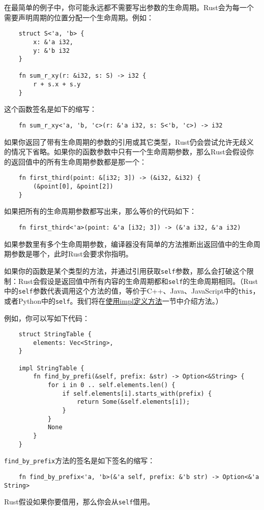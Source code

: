 在最简单的例子中，你可能永远都不需要写出参数的生命周期。Rust会为每一个需要声明周期的位置分配一个生命周期。例如：
\begin{verbatim}
    struct S<'a, 'b> {
        x: &'a i32,
        y: &'b i32
    }

    fn sum_r_xy(r: &i32, s: S) -> i32 {
        r + s.x + s.y
    }
\end{verbatim}

这个函数签名是如下的缩写：
\begin{verbatim}
    fn sum_r_xy<'a, 'b, 'c>(r: &'a i32, s: S<'b, 'c>) -> i32
\end{verbatim}

如果你返回了带有生命周期的参数的引用或其它类型，Rust仍会尝试允许无歧义的情况下省略。如果你的函数参数中只有一个生命周期参数，那么Rust会假设你的返回值中的所有生命周期参数都是那一个：
\begin{verbatim}
    fn first_third(point: &[i32; 3]) -> (&i32, &i32) {
        (&point[0], &point[2])
    }
\end{verbatim}

如果把所有的生命周期参数都写出来，那么等价的代码如下：
\begin{verbatim}
    fn first_third<'a>(point: &'a [i32; 3]) -> (&'a i32, &'a i32)
\end{verbatim}

如果参数里有多个生命周期参数，编译器没有简单的方法推断出返回值中的生命周期参数是哪个，此时Rust会要求你指明。

如果你的函数是某个类型的方法，并通过引用获取\texttt{self}参数，那么会打破这个限制：Rust会假设是返回值中所有内容的生命周期都和\texttt{self}的生命周期相同。（Rust中的\texttt{self}参数代表调用这个方法的值，等价于C++、Java、JavaScript中的\texttt{this}，或者Python中的\texttt{self}。我们将在\hyperref[method]{使用impl定义方法}一节中介绍方法。）

例如，你可以写如下代码：
\begin{verbatim}
    struct StringTable {
        elements: Vec<String>,
    }

    impl StringTable {
        fn find_by_prefi(&self, prefix: &str) -> Option<&String> {
            for i in 0 .. self.elements.len() {
                if self.elements[i].starts_with(prefix) {
                    return Some(&self.elements[i]);
                }
            }
            None
        }
    }
\end{verbatim}

\texttt{find\_by\_prefix}方法的签名是如下签名的缩写：
\begin{verbatim}
    fn find_by_prefix<'a, 'b>(&'a self, prefix: &'b str) -> Option<&'a String>
\end{verbatim}
Rust假设如果你要借用，那么你会从\texttt{self}借用。

